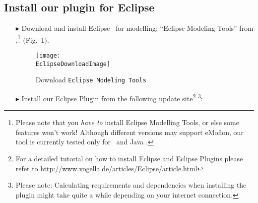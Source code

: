 \newpage
\genHeader
\hypertarget{installPlugin common}{} 
\subsection{Install our plugin for Eclipse}
 
\vspace{0.5cm}
 
\begin{itemize}
  
\item[$\blacktriangleright$] Download and install Eclipse \EclipseVersion~for modelling: ``Eclipse Modeling Tools'' from \EclipseDownloadLink.\footnote{Please
note that you \emph{have to} install Eclipse Modelling Tools, or else some features won't work! Although different versions may support eMoflon, our tool is
currently tested only for \EclipseVersion~and Java \JavaVersion.} (Fig.~\ref{eclipseDownload}).

\begin{figure}[htbp]
	\centering
  	\texttt{[image: \\EclipseDownloadImage]}
	\caption{Download \texttt{Eclipse Modeling Tools}}
	\label{eclipseDownload}
\end{figure}

\vspace{0.5cm}

\item[$\blacktriangleright$] Install our Eclipse Plugin from the following update site\footnote{For a detailed tutorial on how to install Eclipse and Eclipse
Plugins please refer to \url{http://www.vogella.de/articles/Eclipse/article.html}} \footnote{Please note: Calculating requirements and dependencies when
installing the plugin might take quite a while depending on your internet connection.}: \eMoflonUpdateSite


\end{itemize}
